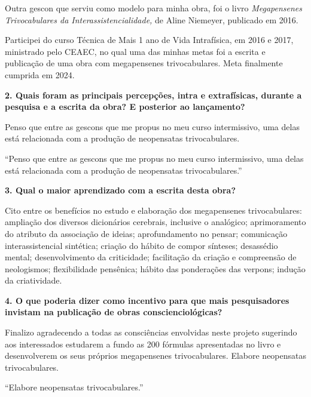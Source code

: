 \documentclass{gescons}
\begin{document}
\begin{multicols}{2}
Outra gescon que serviu como modelo  para minha obra, foi o livro \textit{Megapensenes Trivocabulares da Interassistencialidade,} de Aline Niemeyer, publicado em 2016.

Participei do curso Técnica de Mais 1 ano de Vida Intrafísica, em 2016 e 2017,  ministrado pelo CEAEC, no qual uma das minhas metas foi a escrita e publicação de uma obra com megapensenes trivocabulares. Meta finalmente cumprida em 2024.

\textbf{2.       Quais foram as principais percepções, intra e extrafísicas, durante a pesquisa e a escrita da obra? E posterior ao lançamento?}

Penso que entre as gescons que me propus no meu curso intermissivo, uma delas está relacionada com a produção de neopensatas trivocabulares. 

\begin{pullquote}
    ``Penso que entre as gescons que me propus no meu curso intermissivo, uma delas está relacionada com a produção de neopensatas trivocabulares.''
\end{pullquote}

\textbf{3.       Qual o maior aprendizado com a escrita desta obra?}

Cito entre os benefícios no estudo e elaboração dos megapensenes trivocabulares: ampliação dos diversos dicionários cerebrais, inclusive o analógico; aprimoramento do atributo da associação de ideias; aprofundamento no pensar; comunicação interassistencial sintética; criação do hábito de compor sínteses; desassédio mental; desenvolvimento da criticidade; facilitação da criação e compreensão de neologismos; flexibilidade pensênica; hábito das ponderações das verpons; indução da criatividade.


\textbf{4.       O que poderia dizer como incentivo para que mais pesquisadores invistam na publicação de obras conscienciológicas?}

Finalizo agradecendo a todas as consciências envolvidas neste projeto sugerindo aos interessados estudarem a fundo as 200 fórmulas apresentadas no livro e desenvolverem os seus próprios megapensenes trivocabulares. Elabore neopensatas trivocabulares.


\begin{pullquote}
``Elabore neopensatas trivocabulares.''
\end{pullquote}
    
    \end{multicols}
\end{document}
